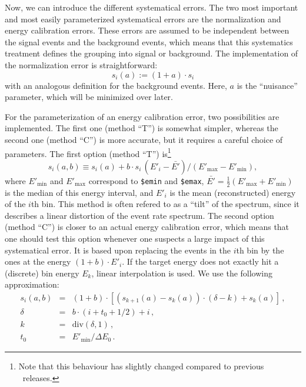 Now, we can introduce the different systematical errors. 
The two most important and
most easily parameterized systematical errors are the normalization 
and energy calibration errors. These errors are assumed to be independent between the signal events and the background events, which means that
this systematics treatment defines the grouping into signal or background.
The implementation of the normalization error
is straightforward:
\begin{equation}
s_i(a):=(1+a)\cdot s_i
\end{equation} 
with an analogous definition for the background events. Here, $a$ is the ``nuisance'' parameter, which will be minimized over later.

For the parameterization of an energy calibration error, two possibilities
are implemented. The first one (method ``T'') is somewhat simpler, 
whereas the second one (method ``C'')
is more accurate, but it requires a careful choice of parameters. 
The first option (method ``T'') is\footnote{Note that this behaviour
has slightly changed compared to previous \GLOBES\ releases.}
\begin{equation}
  s_i(a,b) \equiv s_i(a)+b\cdot s_i \, (E'_i - \bar{E'}) / (E'_\mathrm{max}-E'_\mathrm{min}),
\end{equation}
where $E'_\mathrm{min}$ and $E'_\mathrm{max}$ correspond to {\tt \$emin} and
{\tt \$emax}, $\bar{E'} = \tfrac{1}{2} (E'_\mathrm{max}+E'_\mathrm{min})$ is
the median of this energy interval, and $E'_i$ is the mean (reconstructed)
energy of the $i$th bin.
This method is often refered to as a ``tilt'' of the
spectrum, since it describes a linear distortion 
of the event rate spectrum.
%
The second option (method ``C'') is closer to an actual energy
calibration error, which means that one should test this option whenever
one suspects a large impact of this systematical error.
It is based upon replacing the events in the $i$th bin
by the ones at the energy $(1+b)\cdot E'_i$. If the target energy does not exactly hit
a (discrete) bin energy $E_k$, linear interpolation is used. We use the following approximation:
\begin{eqnarray}
s_i(a,b)&=& (1+b)\cdot \left[ \left( s_{k+1}(a)-s_k(a) \right)\cdot (\delta-k) +s_k(a) \right] \,,
  \label{eq:Ecalib} \\
\delta&=&b\cdot(i+t_0+ 1/2)+i\,,\nonumber\\
k&=& \mathrm{div}(\delta,1)\,,\nonumber\\
t_0&=&E'_\mathrm{min}/\Delta E_0\,.\nonumber
\end{eqnarray}
